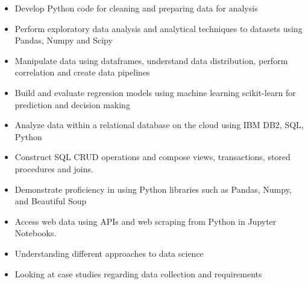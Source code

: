 \documentclass[11pt,a4paper,ragged2e]{altacv}
\begin{document}
\begin{paracol}{1}

\begin{itemize}
\item Develop Python code for cleaning and preparing data for analysis 
\item Perform exploratory data analysis and analytical techniques to datasets using Pandas, Numpy and Scipy
\item Manipulate data using dataframes, understand data distribution, perform correlation and create data pipelines
\item Build and evaluate regression models using machine learning scikit-learn for prediction and decision making
\end{itemize}
\tightdivider

\begin{itemize}
\item Analyze data within a relational database on the cloud using IBM DB2, SQL, Python
\item Construct SQL CRUD operations and compose views, transactions, stored procedures and joins.
\end{itemize}
\tightdivider

\begin{itemize}
\item Demonstrate proficiency in using Python libraries such as Pandas, Numpy, and Beautiful Soup
\item Access web data using APIs and web scraping from Python in Jupyter Notebooks.
\end{itemize}
\tightdivider

\begin{itemize}
\item Understanding different approaches to data science
\item Looking at case studies regarding data collection and requirements
\end{itemize}
\tightdivider


\end{paracol}
\end{document}
